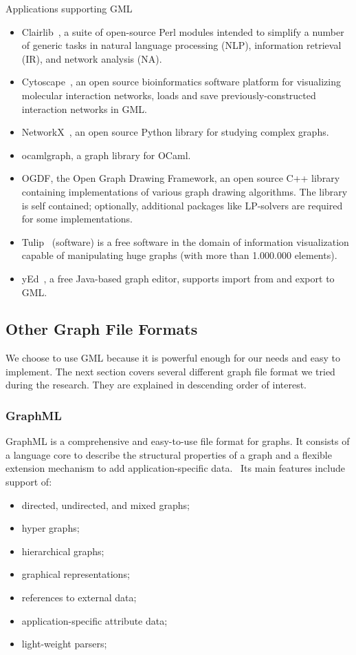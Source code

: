 Applications supporting GML~\cite{GML_wiki}

\begin{itemize}
\item Clairlib~\cite{clairlib}, a suite of open-source Perl modules intended to simplify a number of generic tasks in natural language processing (NLP), information retrieval (IR), and network analysis (NA).
\item Cytoscape~\cite{Cytoscape}, an open source bioinformatics software platform for visualizing molecular interaction networks, loads and save previously-constructed interaction networks in GML.
\item NetworkX~\cite{NetworkX}, an open source Python library for studying complex graphs.
\item ocamlgraph\cite{ocamlgraph}, a graph library for OCaml.
\item OGDF\cite{OGDF}, the Open Graph Drawing Framework, an open source C++ library containing implementations of various graph drawing algorithms. The library is self contained; optionally, additional packages like LP-solvers are required for some implementations.
\item Tulip~\cite{Tulip} (software) is a free software in the domain of information visualization capable of manipulating huge graphs (with more than 1.000.000 elements).
\item yEd~\cite{yed}, a free Java-based graph editor, supports import from and export to GML.
\end{itemize}

\subsection{Other Graph File Formats}

We choose to use GML because it is powerful enough for our needs and easy to implement. The next section covers several different graph file format we tried during the research. They are explained in descending order of interest.

\subsubsection{GraphML}
GraphML is a comprehensive and easy-to-use file format for graphs. It consists of a language core to describe the structural properties of a graph and a flexible extension mechanism to add application-specific data.~\cite{GraphML} Its main features include support of:
\begin{itemize}
\item directed, undirected, and mixed graphs;
\item hyper graphs;
\item hierarchical graphs;
\item graphical representations;
\item references to external data;
\item application-specific attribute data;
\item light-weight parsers;
\end{itemize}

